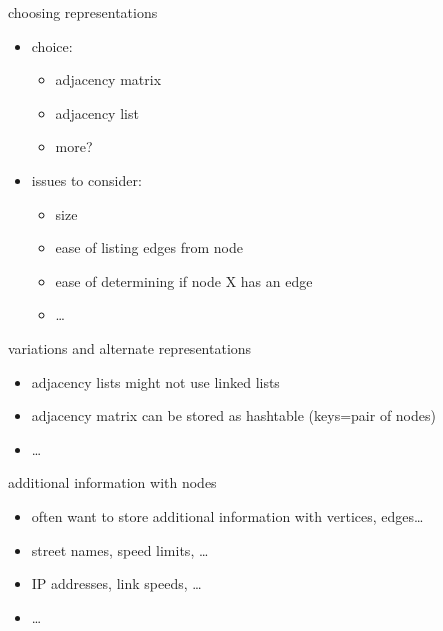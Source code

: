 \begin{frame}{choosing representations}
\begin{itemize}
\item choice:
\begin{itemize}
\item adjacency matrix
\item adjacency list
\item more?
\end{itemize}
\item issues to consider:
\begin{itemize}
\item size
\item ease of listing edges from node
\item ease of determining if node X has an edge
\item \ldots
\end{itemize}
\end{itemize}
\end{frame}

\begin{frame}{variations and alternate representations}
\begin{itemize}
\item adjacency lists might not use linked lists
\item adjacency matrix can be stored as hashtable (keys=pair of nodes)
\item \ldots
\end{itemize}
\end{frame}

\begin{frame}{additional information with nodes}
\begin{itemize}
\item often want to store additional information with vertices, edges\ldots
\vspace{.5cm}
\item street names, speed limits, \ldots
\item IP addresses, link speeds, \ldots
\item \ldots
\end{itemize}
\end{frame}
